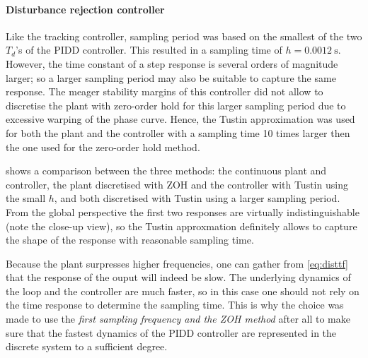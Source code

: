 \paragraph{Disturbance rejection controller}
Like the tracking controller, sampling period was based on the smallest of the two $T_d$'s of the PIDD controller. This resulted in a sampling time of $h = \SI{0.0012}{\second}$. However, the time constant of a step response is several orders of magnitude larger; so a larger sampling period may also be suitable to capture the same response. The meager stability margins of this controller did not allow to discretise the plant with zero-order hold for this larger sampling period due to excessive warping of the phase curve. Hence, the Tustin approximation was used for both the plant and the controller with a sampling time 10 times larger then the one used for the zero-order hold method. 

 shows a comparison between the three methods: the continuous plant and controller, the plant discretised with ZOH and the controller with Tustin using the small $h$, and both discretised with Tustin using a larger sampling period. From the global perspective the first two responses are virtually indistinguishable (note the close-up view), so the Tustin approxmation definitely allows to capture the shape of the response with reasonable sampling time. 

Because the plant surpresses higher frequencies, one can gather from \cref{eq:disttf} that the response of the ouput will indeed be slow. The underlying dynamics of the loop and the controller are much faster, so in this case one should not rely on the time response to determine the sampling time. This is why the choice was made to use the \textit{first sampling frequency and the ZOH method} after all to make sure that the fastest dynamics of the PIDD controller are represented in the discrete system to a sufficient degree. 